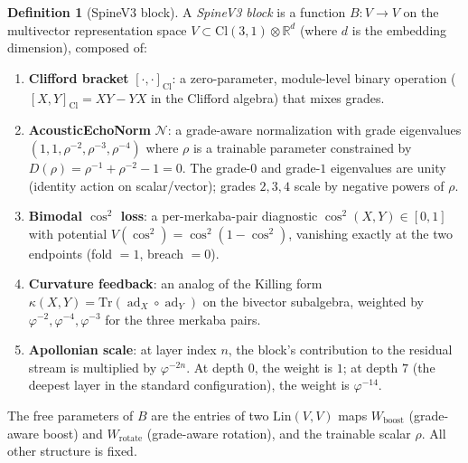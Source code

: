 \documentclass[11pt,a4paper]{article}
\theoremstyle{plain}
\theoremstyle{definition}
\newtheorem{definition}[theorem]{Definition}
\theoremstyle{remark}
\numberwithin{equation}{section}
\providecommand{\Cl}{\mathrm{Cl}}
\providecommand{\R}{\mathbb{R}}
\providecommand{\vp}{\varphi}
\DeclareMathOperator{\ad}{ad}
\begin{document}
\begin{definition}[SpineV3 block]
\label{def:spine-block}
A \emph{SpineV3 block} is a function
$B \colon V \to V$ on the multivector representation space
$V \subset \Cl(3,1) \otimes \R^d$ (where $d$ is the embedding
dimension), composed of:
\begin{enumerate}[label=\textnormal{(B\arabic*)}]
\item \textbf{Clifford bracket} $[\cdot, \cdot]_{\mathrm{Cl}}$: a
  zero-parameter, module-level binary operation
  ($[X, Y]_{\mathrm{Cl}} = XY - YX$ in the Clifford algebra)
  that mixes grades.
\item \textbf{AcousticEchoNorm} $\mathcal{N}$: a grade-aware
  normalization with grade eigenvalues
  $(1, 1, \rho^{-2}, \rho^{-3}, \rho^{-4})$ where $\rho$ is a
  trainable parameter constrained by
  $D(\rho) = \rho^{-1} + \rho^{-2} - 1 = 0$.  The grade-$0$ and
  grade-$1$ eigenvalues are unity (identity action on
  scalar/vector); grades $2, 3, 4$ scale by negative powers of
  $\rho$.
\item \textbf{Bimodal $\cos^2$ loss}: a per-merkaba-pair
  diagnostic
  $\cos^2(X, Y) \in [0, 1]$ with potential
  $V(\cos^2) = \cos^2(1 - \cos^2)$, vanishing exactly at the two
  endpoints (fold $= 1$, breach $= 0$).
\item \textbf{Curvature feedback}: an analog of the Killing form
  $\kappa(X, Y) = \mathrm{Tr}(\ad_X \circ \ad_Y)$ on the bivector
  subalgebra, weighted by $\vp^{-2}, \vp^{-4}, \vp^{-3}$ for the
  three merkaba pairs.
\item \textbf{Apollonian scale}: at layer index $n$, the block's
  contribution to the residual stream is multiplied by
  $\vp^{-2n}$.  At depth $0$, the weight is $1$; at depth $7$
  (the deepest layer in the standard configuration), the weight
  is $\vp^{-14}$.
\end{enumerate}
The free parameters of $B$ are the entries of two
$\mathrm{Lin}(V, V)$ maps $W_{\mathrm{boost}}$ (grade-aware
boost) and $W_{\mathrm{rotate}}$ (grade-aware rotation), and the
trainable scalar $\rho$.  All other structure is fixed.
\end{definition}
\end{document}
